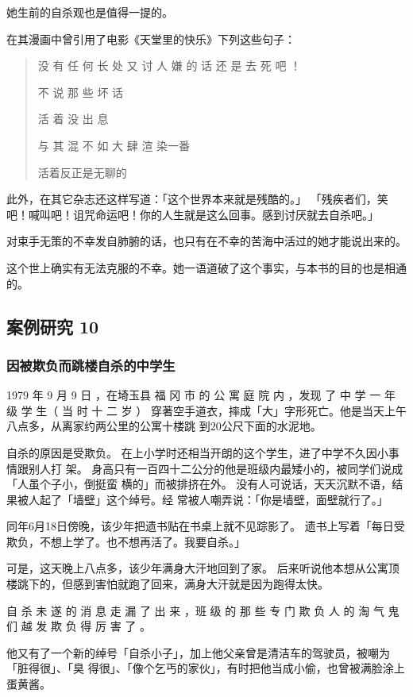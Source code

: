 \documentclass[UTF8]{ctexart}
\begin{document}
她生前的自杀观也是值得一提的。

在其漫画中曾引用了电影《天堂里的快乐》下列这些句子：

\begin{verse}

没 有 任 何 长 处 又 讨 人 嫌 的 话 还 是 去 死 吧 ！

不 说 那 些 坏 话

活 着 没 出 息

与 其 混 不 如 大 肆 渲 染一番

活着反正是无聊的
\end{verse}

此外，在其它杂志还这样写道：「这个世界本来就是残酷的。」
「残疾者们，笑吧！喊叫吧！诅咒命运吧！你的人生就是这么回事。感到讨厌就去自杀吧。」

对束手无策的不幸发自肺腑的话，也只有在不幸的苦海中活过的她才能说出来的。

这个世上确实有无法克服的不幸。她一语道破了这个事实，与本书的目的也是相通的。

\subsection{案例研究 10}
\subsubsection*{因被欺负而跳楼自杀的中学生}

1979 年 9 月 9 日 ，在埼玉县 福 冈 市 的 公 寓 庭 院 内 ，发现 了 中 学 一 年 级 学 生（ 当 时 十 二 岁 ） 穿著空手道衣，摔成「大」字形死亡。他是当天上午八点多，从离家约两公里的公寓十楼跳 到$20$公尺下面的水泥地。

自杀的原因是受欺负。
在上小学时还相当开朗的这个学生，进了中学不久因小事情跟别人打 架。
身高只有一百四十二公分的他是班级内最矮小的，被同学们说成「人虽个子小，倒挺蛮 横的」而被排挤在外。
没有人可说话，天天沉默不语，结果被人起了「墙壁」这个绰号。经 常被人嘲弄说：「你是墙壁，面壁就行了。」

同年6月18日傍晚，该少年把遗书贴在书桌上就不见踪影了。
遗书上写着「每日受欺负，不想上学了。也不想再活了。我要自杀。」

可是，这天晚上八点多，该少年满身大汗地回到了家。
后来听说他本想从公寓顶楼跳下的，但感到害怕就跑了回来，满身大汗就是因为跑得太快。

自 杀 未 遂 的 消 息 走 漏 了 出 来 ，班 级 的 那 些 专 门 欺 负 人 的 淘 气 鬼 们 越 发 欺 负 得 厉 害 了 。

他又有了一个新的绰号「自杀小子」，加上他父亲曾是清洁车的驾驶员，被嘲为「脏得很」、「臭 得很」、「像个乞丐的家伙」，有时把他当成小偷，也曾被满脸涂上蛋黄酱。
\end{document}
